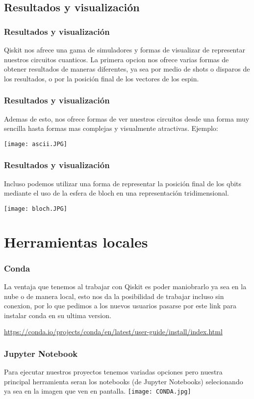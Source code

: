 \documentclass[spanish]{beamer}
\begin{document}
\newpage\justify
\begin{frame}\subsection{Resultados y visualización}
\frametitle{Resultados y visualización}
Qiskit nos afrece una gama de simuladores y formas de visualizar de representar nuestros circuitos cuanticos. La primera opcion nos ofrece varias formas de obtener resultados de maneras diferentes, ya sea por medio de shots o disparos de los resultados, o por la posición final de los vectores de los espin.
\end{frame}

\newpage\justify
\begin{frame}
\frametitle{Resultados y visualización}
Ademas de esto, nos ofrece formas de ver nuestros circuitos desde una forma muy sencilla hasta formas mas complejas y visualmente atractivas. Ejemplo:

\centering\texttt{[image: ascii.JPG]}
\end{frame}

\newpage\justify
\begin{frame}
\frametitle{Resultados y visualización}
Incluso podemos utilizar una forma de representar la posición final de los qbits mediante el uso de la esfera de bloch en una representación tridimensional.

\centering\texttt{[image: bloch.JPG]}
\end{frame}
\section{Herramientas locales}        
 \setlength{\parskip}{1mm}
 \begin{frame}[fragile]
 \frametitle{Conda} 
 \justify 
 La ventaja que tenemos al trabajar con Qiskit es poder maniobrarlo ya sea en la nube o de manera local, esto nos da la posibilidad de trabajar incluso sin conexion, por lo que pedimos a los nuevos usuarios pasarse por este link para instalar conda en su ultima version.
 
\url{https://conda.io/projects/conda/en/latest/user-guide/install/index.html} 
\end{frame}

       
 \newpage\setlength{\parskip}{1mm}
 \begin{frame}[fragile]
 \frametitle{Jupyter Notebook} 
 \justify 
 Para ejecutar nuestros proyectos tenemos variadas opciones pero nuestra principal herramienta seran los notebooks (de Jupyter Notebooks) selecionando ya sea en la imagen que ven en pantalla. 
\centering\texttt{[image: CONDA.jpg]}
\end{frame}
\end{document}
